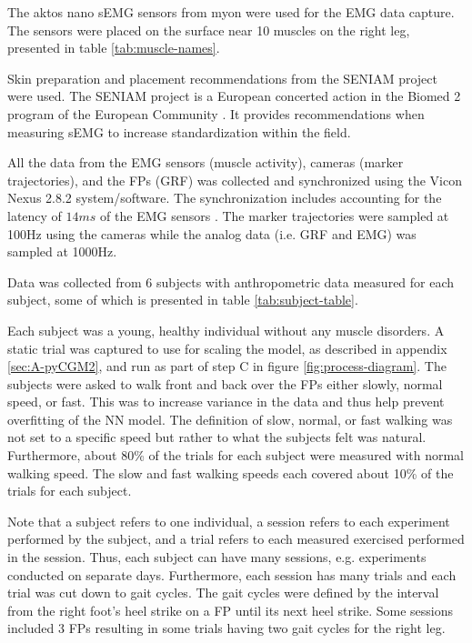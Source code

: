 \documentclass[../main.tex]{subfiles}
\begin{document}
The aktos nano \ac{sEMG} sensors from myon were used for the \ac{EMG} data capture. 
The sensors were placed on the surface near 10 muscles on the right leg, presented in table \ref{tab:muscle-names}. 

Skin preparation and placement recommendations from the SENIAM project \cite{Stegeman2007, Hermens1999, Hermens2000} were used. The SENIAM project is a European concerted action in the Biomed 2 program of the European Community \cite{Stegeman2007}. It provides recommendations when measuring \ac{sEMG} to increase standardization within the field.

All the data from the \ac{EMG} sensors (muscle activity), cameras (marker trajectories), and the \acp{FP} (\ac{GRF}) was collected and synchronized using the Vicon Nexus 2.8.2 system/software.
The synchronization includes accounting for the latency of $14ms$ of the \ac{EMG} sensors \cite{aktosEMG}.
The marker trajectories were sampled at 100Hz using the cameras while the analog data (i.e. \ac{GRF} and \ac{EMG}) was sampled at 1000Hz.

Data was collected from 6 subjects with anthropometric data measured for each subject, some of which is presented in table \ref{tab:subject-table}.

Each subject was a young, healthy individual without any muscle disorders.
A static trial was captured to use for scaling the model, as described in appendix \ref{sec:A-pyCGM2}, and run as part of step C in figure \ref{fig:process-diagram}.
The subjects were asked to walk front and back over the \acp{FP} either slowly, normal speed, or fast.
This was to increase variance in the data and thus help prevent overfitting of the \ac{NN} model.
The definition of slow, normal, or fast walking was not set to a specific speed but rather to what the subjects felt was natural.
Furthermore, about 80\% of the trials for each subject were measured with normal walking speed.
The slow and fast walking speeds each covered about 10\% of the trials for each subject.

Note that a subject refers to one individual, a session refers to each experiment performed by the subject, and a trial refers to each measured exercised performed in the session. 
Thus, each subject can have many sessions, e.g. experiments conducted on separate days.
Furthermore, each session has many trials and each trial was cut down to gait cycles. 
The gait cycles were defined by the interval from the right foot's heel strike on a \ac{FP} until its next heel strike.
Some sessions included 3 \acp{FP} resulting in some trials having two gait cycles for the right leg.
\end{document}
